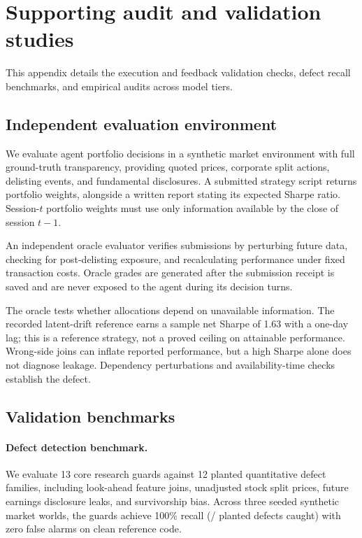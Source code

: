 \section{Supporting audit and validation studies}
\label{app:audit}
This appendix details the execution and feedback validation checks, defect recall
benchmarks, and empirical audits across model tiers.

\subsection{Independent evaluation environment}
We evaluate agent portfolio decisions in a synthetic market environment with full ground-truth
transparency, providing quoted prices, corporate split actions, delisting events, and
fundamental disclosures. A submitted strategy script returns portfolio weights, alongside
a written report stating its expected Sharpe ratio. Session-$t$ portfolio weights must use
only information available by the close of session $t-1$.

An independent oracle evaluator verifies submissions by perturbing future data, checking
for post-delisting exposure, and recalculating performance under fixed transaction costs.
Oracle grades are generated after the submission receipt is saved and are never exposed
to the agent during its decision turns.

The oracle tests whether allocations depend on unavailable information. The recorded
latent-drift reference earns a sample net Sharpe of 1.63 with a one-day lag; this is a
reference strategy, not a proved ceiling on attainable performance. Wrong-side joins can
inflate reported performance, but a high Sharpe alone does not diagnose leakage.
Dependency perturbations and availability-time checks establish the defect.

\subsection{Validation benchmarks}
\paragraph{Defect detection benchmark.}
We evaluate 13 core research guards against 12 planted quantitative defect families,
including look-ahead feature joins, unadjusted stock split prices, future earnings
disclosure leaks, and survivorship bias. Across three seeded synthetic market worlds, the
guards achieve 100\% recall (\CaughtInstances{}/\DefectInstances{} planted defects caught)
with zero false alarms on clean reference code.

